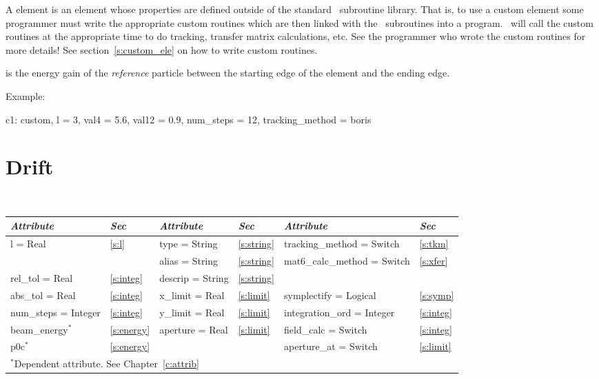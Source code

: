 A  element is an element whose properties are defined
outside of the standard \bmad\ subroutine library. That is, to use a
custom element some programmer must write the appropriate custom
routines which are then linked with the \bmad\ subroutines into a
program. \bmad\ will call the custom routines at the appropriate time
to do tracking, transfer matrix calculations, etc. See the programmer
who wrote the custom routines for more details! See 
section~\ref{s:custom_ele} on how to write custom routines.

 is the energy gain of the {\it reference} particle
between the starting edge of the element and the ending edge.

Example:
\begin{example}
  c1: custom, l = 3, val4 = 5.6, val12 = 0.9, num_steps = 12, tracking_method = boris
\end{example}

\section{Drift}
\label{s:drift}

\begin{center}
\tt
\begin{tabular}{|l|l||l|l||l|l|} \hline
  {\sl Attribute} & {\sl Sec}  & {\sl Attribute} & {\sl Sec} & {\sl Attribute} & {\sl Sec} \\ \hline
  l        = Real       & \ref{s:l}     & type = String    & \ref{s:string} & tracking\_method = Switch    & \ref{s:tkm}   \\ \hline
                        &               & alias = String   & \ref{s:string} & mat6\_calc\_method = Switch  & \ref{s:xfer}  \\ \hline
  rel\_tol = Real       & \ref{s:integ} & descrip = String & \ref{s:string} &                              &               \\ \hline
  abs\_tol = Real       & \ref{s:integ} & x\_limit = Real  & \ref{s:limit}  & symplectify = Logical        & \ref{s:symp}  \\ \hline
  num\_steps = Integer  & \ref{s:integ} & y\_limit = Real  & \ref{s:limit}  & integration\_ord = Integer   & \ref{s:integ} \\ \hline
  beam\_energy$^*$      & \ref{s:energy}& aperture = Real  & \ref{s:limit}  & field\_calc = Switch         & \ref{s:integ} \\ \hline
  p0c$^*$               & \ref{s:energy}&                  &                & aperture\_at = Switch        & \ref{s:limit} \\ \hline
  \multicolumn{6}{l}{\small $^*$Dependent attribute. See Chapter~\ref{c:attrib}} \\
\end{tabular}
\end{center}
\toffset

